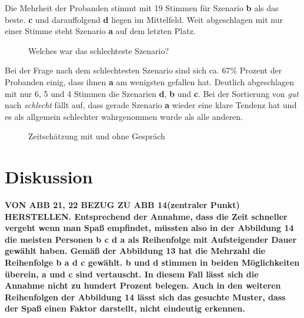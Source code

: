 \documentclass{Paper}
\begin{document}
Die Mehrheit der Probanden stimmt mit 19 Stimmen für Szenario \textbf{b} als das beste. \textbf{c} und darauffolgend \textbf{d} liegen im Mittelfeld. Weit abgeschlagen mit nur einer Stimme steht Szenario \textbf{a} auf dem letzten Platz.
	
	
	\begin{figure}[ht]
\caption{Welches war das schlechteste Szenario?}
\label{SzenarioSchlecht}
\end{figure}
	

Bei der Frage nach dem schlechtesten Szenario sind sich ca. 67\% Prozent der Probanden einig, dass ihnen \textbf{a} am wenigsten gefallen hat. Deutlich abgeschlagen mit nur 6, 5 und 4 Stimmen die Szenarien \textbf{d}, \textbf{b} und \textbf{c}. 
Bei der Sortierung von \textit{gut} nach \textit{schlecht} fällt auf, dass gerade Szenario \textbf{a} wieder eine klare Tendenz hat und es als allgemein schlechter wahrgenommen wurde als alle anderen.


\begin{figure}[H]
\label{time}
\caption{Zeitschätzung mit und ohne Gespräch}
\label{ZeitGeschaetzt}
\end{figure}


\section{Diskussion}
\textbf{VON ABB 21, 22 BEZUG ZU ABB 14(zentraler Punkt) HERSTELLEN. Entsprechend der Annahme, dass die Zeit schneller vergeht wenn man Spaß empfindet, müssten also in der Abbildung 14 die meisten Personen \textbf{b c d a} als Reihenfolge mit Aufsteigender Dauer gewählt haben. Gemäß der Abbildung 13 hat die Mehrzahl die Reihenfolge \textbf{b a d c} gewählt. \textbf{b} und \textbf{d} stimmen in beiden Möglichkeiten überein, \textbf{a} und \textbf{c} sind vertauscht. In diesem Fall lässt sich die Annahme nicht zu hundert Prozent belegen. Auch in den weiteren Reihenfolgen der Abbildung 14 lässt sich das gesuchte Muster, dass der Spaß einen Faktor darstellt, nicht eindeutig erkennen.}
\end{document}

